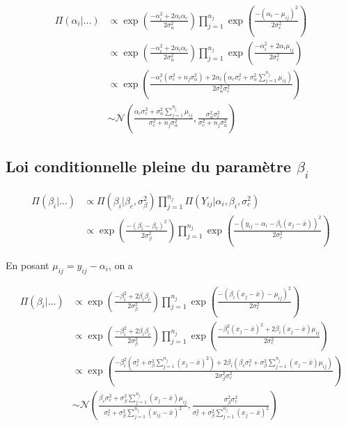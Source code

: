 \documentclass[
]{article}
\begin{document}
\begin{align*}
\Pi(\alpha_{i}|...)&\propto \exp\left(\frac{-\alpha_i^2+2\alpha_i\alpha_c}{2\sigma_{\alpha}^{2}}\right) \prod_{j=1}^{n_{j}} \exp\left(\frac{-(\alpha_{i}-\mu_{ij})^{2}}{2\sigma_{c}^{2}}\right)  \\
        &\propto \exp\left(\frac{-\alpha_i^2+2\alpha_i\alpha_c}{2\sigma_{\alpha}^{2}}\right) \prod_{j=1}^{n_{j}} \exp\left(\frac{-\alpha_i^2+2\alpha_i\mu_{ij}}{2\sigma_{c}^{2}}\right)  \\
        &\propto \exp\left(\frac{-\alpha_i^2(\sigma_c^2+n_j\sigma_{\alpha}^2) +2\alpha_i(\alpha_c\sigma_c^2+\sigma_{\alpha}^2\sum\limits_{j=1}^{n_j} \mu_{ij})}{2\sigma_{\alpha}^{2}\sigma_c^2}\right)\\
        &\sim \mathcal{N}\left(\frac{\alpha_c\sigma_c^2+\sigma_{\alpha}^2\sum\limits_{j=1}^{n_j} \mu_{ij}}{\sigma_c^2+n_j\sigma_{\alpha}^2},\frac{\sigma_{\alpha}^{2}\sigma_c^2}{\sigma_c^2+n_j\sigma_{\alpha}^2}\right)
\end{align*}

\hypertarget{loi-conditionnelle-pleine-du-paramuxe8tre-beta_i}{%
\subsection{\texorpdfstring{Loi conditionnelle pleine du paramètre
\(\beta_i\)}{Loi conditionnelle pleine du paramètre \textbackslash beta\_i}}\label{loi-conditionnelle-pleine-du-paramuxe8tre-beta_i}}

\begin{align*}
\Pi(\beta_{i}|...) &\propto \Pi(\beta_{i}|\beta_{c},\sigma_{\beta}^{2} ) \prod_{j=1}^{n_{j}} \Pi(Y_{ij}|\alpha_{i},\beta_{i},\sigma_{c}^{2} ) \\
        &\propto \exp\left(\frac{-(\beta_{i}-\beta_{c})^{2}}{2\sigma_{\beta}^{2}}\right) \prod_{j=1}^{n_{j}} \exp\left(\frac{-(y_{ij}-\alpha_{i}-\beta_i(x_{j}-\bar{x}))^{2}}{2\sigma_{c}^{2}}\right) 
\end{align*}

En posant \(\mu_{ij} = y_{ij} - \alpha_i\), on a

\begin{align*}
\Pi(\beta_{i}|...)&\propto \exp\left(\frac{-\beta_i^2+2\beta_i\beta_c}{2\sigma_{\beta}^{2}}\right) \prod_{j=1}^{n_{j}} \exp\left(\frac{-(\beta_{i}(x_{j}-\bar{x})-\mu_{ij})^{2}}{2\sigma_{c}^{2}}\right)  \\
        &\propto \exp\left(\frac{-\beta_i^2+2\beta_i\beta_c}{2\sigma_{\beta}^{2}}\right) \prod_{j=1}^{n_{j}} \exp\left(\frac{-\beta_i^2(x_{j}-\bar{x})^2+2\beta_i(x_{j}-\bar{x})\mu_{ij}}{2\sigma_{c}^{2}}\right)  \\
        &\propto \exp\left(\frac{-\beta_i^2(\sigma_c^2+\sigma_{\beta}^2\sum\limits_{j=1}^{n_j}(x_{j}-\bar{x})^2) +2\beta_i(\beta_c\sigma_c^2+\sigma_{\beta}^2\sum\limits_{j=1}^{n_j} (x_{j}-\bar{x})\mu_{ij})}{2\sigma_{\beta}^{2}\sigma_c^2}\right)\\
        &\sim \mathcal{N}\left(\frac{\beta_c\sigma_c^2+\sigma_{\beta}^2\sum\limits_{j=1}^{n_j} (x_{j}-\bar{x})\mu_{ij}}{\sigma_c^2+\sigma_{\beta}^2\sum\limits_{j=1}^{n_j}(x_{ij}-\bar{x})^2},\frac{\sigma_{\beta}^{2}\sigma_c^2}{\sigma_c^2+\sigma_{\beta}^2\sum\limits_{j=1}^{n_j}(x_{j}-\bar{x})^2}\right)
\end{align*}
\end{document}
